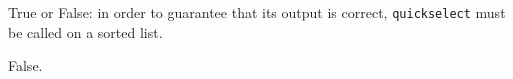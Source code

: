 \begin{prob}
    True or False: in order to guarantee that its output is correct,
    \texttt{quickselect} must be called on a sorted list.

    \tF{}

    \begin{soln}
        False.
    \end{soln}
\end{prob}
